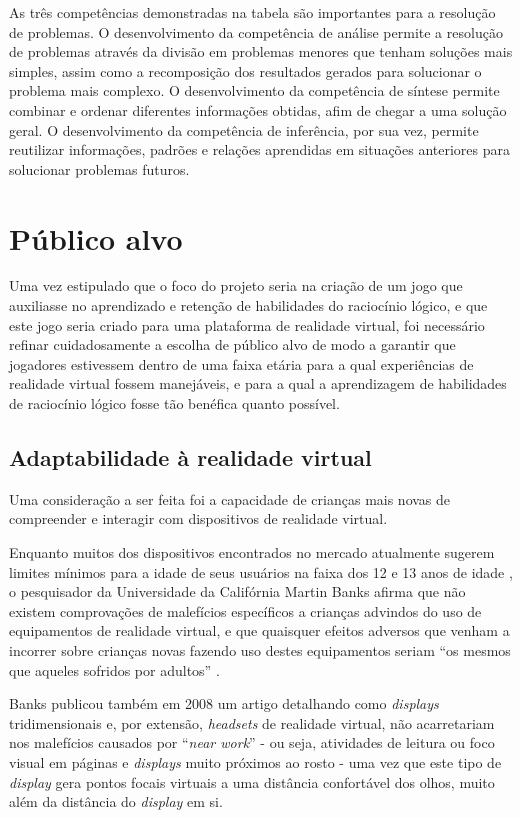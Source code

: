As três competências demonstradas na tabela são importantes para a resolução 
de problemas. O desenvolvimento da competência de análise permite a resolução
de problemas através da divisão em problemas menores que tenham soluções 
mais simples, assim como a recomposição dos resultados gerados para solucionar 
o problema mais complexo. O desenvolvimento da competência de síntese permite
combinar e ordenar diferentes informações obtidas, afim de chegar a uma solução
geral. O desenvolvimento da competência de inferência, por sua vez, permite
reutilizar informações, padrões e relações aprendidas em situações anteriores 
para solucionar problemas futuros.

\section{Público alvo}\label{sec-publico-alvo}

Uma vez estipulado que o foco do projeto seria na criação de um jogo que
auxiliasse no aprendizado e retenção de habilidades do raciocínio lógico,
e que este jogo seria criado para uma plataforma de realidade virtual,
foi necessário refinar cuidadosamente a escolha de público alvo de modo a
garantir que jogadores estivessem dentro de uma faixa etária para a qual 
experiências de realidade virtual fossem manejáveis, e para a qual a
aprendizagem de habilidades de raciocínio lógico fosse tão benéfica quanto
possível.

\subsection{Adaptabilidade à realidade virtual}

Uma consideração a ser feita foi a capacidade de crianças mais novas de
compreender e interagir com dispositivos de realidade virtual.

Enquanto muitos dos dispositivos encontrados no mercado atualmente sugerem
limites mínimos para a idade de seus usuários na faixa dos 12 e 13 anos de
idade \cite{seeto:2016:playstation-vr}, o pesquisador da Universidade da Califórnia Martin Banks afirma que
não existem comprovações de malefícios específicos a crianças advindos do
uso de equipamentos de realidade virtual, e que quaisquer efeitos adversos
que venham a incorrer sobre crianças novas fazendo uso destes equipamentos
seriam ``os mesmos que aqueles sofridos por adultos'' \cite{hill:2016:vr-safe}.

Banks publicou também em 2008 um artigo \cite{hoffman2008vergence} 
detalhando como \textit{displays}
tridimensionais e, por extensão, \textit{headsets} de realidade virtual,
não acarretariam nos malefícios causados por ``\textit{near work}'' - ou
seja, atividades de leitura ou foco visual em páginas e \textit{displays}
muito próximos ao rosto - uma vez que este tipo de \textit{display} gera
pontos focais virtuais a uma distância confortável dos olhos, muito além
da distância do \textit{display} em si.

